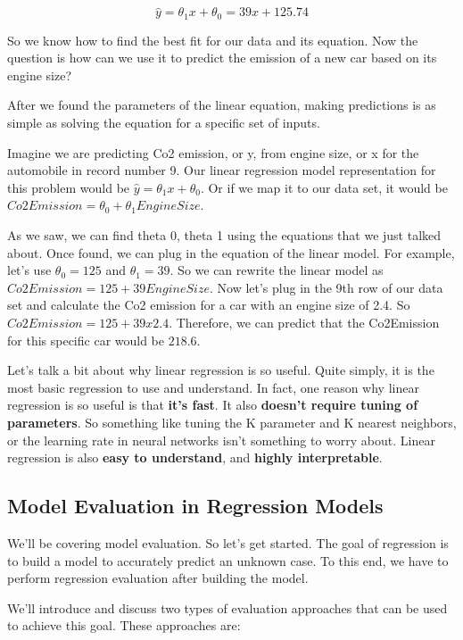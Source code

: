 	\begin{equation}
		\hat{y} = \theta_{1}x +\theta_{0}
				= 39x + 125.74
	\end{equation}
	
	So we know how to find the best fit for our data and its equation. Now the question is how can we use it to predict the emission of a new car based on its engine size?
	
	After we found the parameters of the linear equation, making predictions is as simple as solving the equation for a specific set of inputs.
	
	Imagine we are predicting Co2 emission, or y, from engine size, or x for the automobile in record number 9. Our linear regression model representation for this problem would be $\hat{y} = \theta_{1}x +\theta_{0}$. Or if we map it to our data set, it would be $Co2Emission =\theta_{0} + \theta_{1} EngineSize$.
	
	As we saw, we can find theta 0, theta 1 using the equations that we just talked about. Once found, we can plug in the equation of the linear model. For example, let's use $\theta_{0} = 125$ and $\theta_{1} = 39$. So we can rewrite the linear model as $Co2Emission = 125 + 39 EngineSize$. Now let's plug in the 9th row of our data set and calculate the Co2 emission for a car with an engine size of 2.4. So $Co2Emission = 125 + 39 x 2.4$. Therefore, we can predict that the Co2Emission for this specific car would be $218.6$. 
	
	Let's talk a bit about why linear regression is so useful. Quite simply, it is the most basic regression to use and understand. In fact, one reason why linear regression is so useful is that \textbf{it's fast}. It also \textbf{doesn't require tuning of parameters}. So something like tuning the K parameter and K nearest neighbors, or the learning rate in neural networks isn't something to worry about. Linear regression is also \textbf{easy to understand}, and \textbf{highly interpretable}.
	
	\subsection{Model Evaluation in Regression Models}
	
    We'll be covering model evaluation. So let's get started. The goal of regression is to build a model to accurately predict an unknown case. To this end, we have to perform regression evaluation after building the model. 
    
    We'll introduce and discuss two types of evaluation approaches that can be used to achieve this goal. 
    These approaches are:
    
